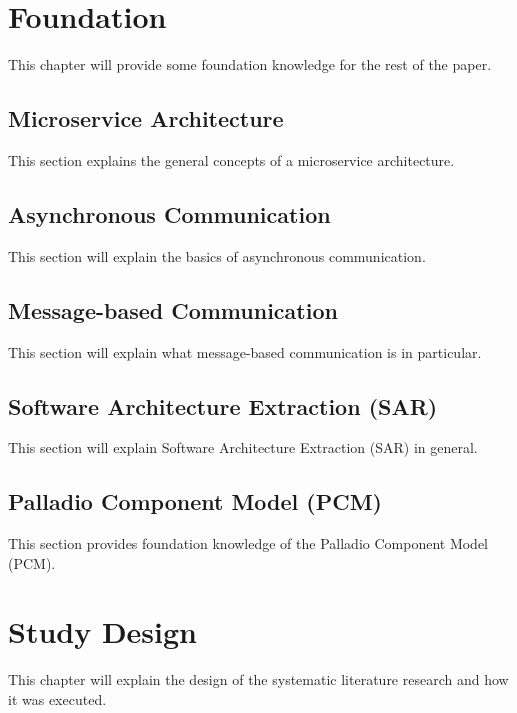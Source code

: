 
\section{Foundation}
\label{cha:Foundation}
This chapter will provide some foundation knowledge for the rest of the paper.

\subsection{Microservice Architecture}
\label{sec:Foundation:MicroserviceArchitecture}
This section explains the general concepts of a microservice architecture.
\cite{Dragoni2017}

\subsection{Asynchronous Communication}
\label{sec:Foundation:AsyncCommunication}
This section will explain the basics of asynchronous communication.

\subsection{Message-based Communication}
\label{sec:Foundation:MessageBasedCommunication}
This section will explain what message-based communication is in particular.

\subsection{Software Architecture Extraction (SAR)}
\label{sec:Foundation:SAR}
This section will explain Software Architecture Extraction (SAR) in general.

\subsection{Palladio Component Model (PCM)}
\label{sec:Foundation:PCM}
This section provides foundation knowledge of the Palladio Component Model (PCM).
\cite{Becker2008}

\section{Study Design}
\label{cha:StudyDesign}
This chapter will explain the design of the systematic literature research and how it was executed.


